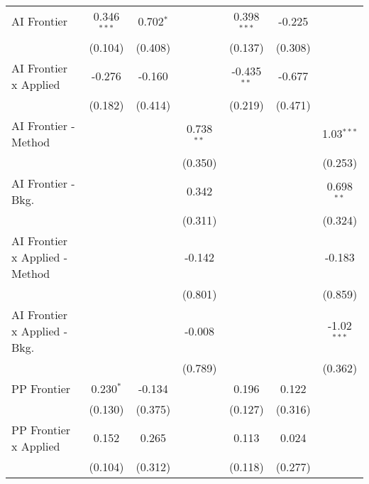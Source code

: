 \begin{tabular}{lcccccc}
   AI Frontier                    & 0.346$^{***}$ & 0.702$^{*}$ &              & 0.398$^{***}$ & -0.225       &   \\   
                                  & (0.104)       & (0.408)     &              & (0.137)       & (0.308)      &   \\   
   AI Frontier x Applied          & -0.276        & -0.160      &              & -0.435$^{**}$ & -0.677       &   \\   
                                  & (0.182)       & (0.414)     &              & (0.219)       & (0.471)      &   \\   
   AI Frontier - Method           &               &             & 0.738$^{**}$ &               &              & 1.03$^{***}$\\   
                                  &               &             & (0.350)      &               &              & (0.253)\\   
   AI Frontier - Bkg.             &               &             & 0.342        &               &              & 0.698$^{**}$\\   
                                  &               &             & (0.311)      &               &              & (0.324)\\   
   AI Frontier x Applied - Method &               &             & -0.142       &               &              & -0.183\\   
                                  &               &             & (0.801)      &               &              & (0.859)\\   
   AI Frontier x Applied - Bkg.   &               &             & -0.008       &               &              & -1.02$^{***}$\\   
                                  &               &             & (0.789)      &               &              & (0.362)\\   
   PP Frontier                    & 0.230$^{*}$   & -0.134      &              & 0.196         & 0.122        &   \\   
                                  & (0.130)       & (0.375)     &              & (0.127)       & (0.316)      &   \\   
   PP Frontier x Applied          & 0.152         & 0.265       &              & 0.113         & 0.024        &   \\   
                                  & (0.104)       & (0.312)     &              & (0.118)       & (0.277)      &   \\   

\end{tabular}
